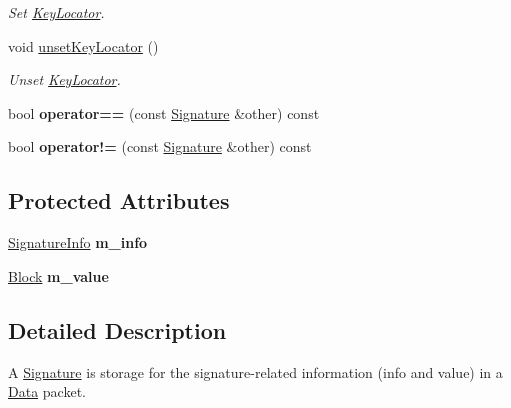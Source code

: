 \begin{DoxyCompactItemize}
\begin{DoxyCompactList}\small\item\em Set \hyperlink{classndn_1_1KeyLocator}{Key\+Locator}. \end{DoxyCompactList}\item 
void \hyperlink{classndn_1_1Signature_a5bd5533cadbb807d3ba3175470de746f}{unset\+Key\+Locator} ()
\begin{DoxyCompactList}\small\item\em Unset \hyperlink{classndn_1_1KeyLocator}{Key\+Locator}. \end{DoxyCompactList}\item 
bool {\bfseries operator==} (const \hyperlink{classndn_1_1Signature}{Signature} \&other) const\hypertarget{classndn_1_1Signature_a22fc80e22556b6c53adb9f42501a4ed1}{}\label{classndn_1_1Signature_a22fc80e22556b6c53adb9f42501a4ed1}

\item 
bool {\bfseries operator!=} (const \hyperlink{classndn_1_1Signature}{Signature} \&other) const\hypertarget{classndn_1_1Signature_ad8bad9cade6674553b8413808a301a40}{}\label{classndn_1_1Signature_ad8bad9cade6674553b8413808a301a40}

\end{DoxyCompactItemize}
\subsection*{Protected Attributes}
\begin{DoxyCompactItemize}
\item 
\hyperlink{classndn_1_1SignatureInfo}{Signature\+Info} {\bfseries m\+\_\+info}\hypertarget{classndn_1_1Signature_a08fb250d80fd532b723db29c959539c7}{}\label{classndn_1_1Signature_a08fb250d80fd532b723db29c959539c7}

\item 
\hyperlink{classndn_1_1Block}{Block} {\bfseries m\+\_\+value}\hypertarget{classndn_1_1Signature_a6a658d03507d2c4c07cc7143408f2101}{}\label{classndn_1_1Signature_a6a658d03507d2c4c07cc7143408f2101}

\end{DoxyCompactItemize}


\subsection{Detailed Description}
A \hyperlink{classndn_1_1Signature}{Signature} is storage for the signature-\/related information (info and value) in a \hyperlink{classndn_1_1Data}{Data} packet. 

